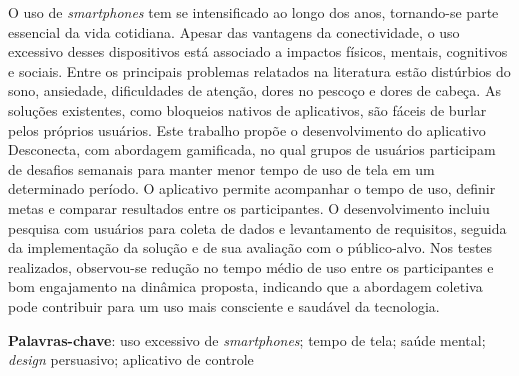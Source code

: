 \begin{resumo}
\begin{SingleSpace}
O uso de \textit{smartphones} tem se intensificado ao longo dos anos, tornando-se parte essencial da vida cotidiana. Apesar das vantagens da conectividade, o uso excessivo desses dispositivos está associado a impactos físicos, mentais, cognitivos e sociais. Entre os principais problemas relatados na literatura estão distúrbios do sono, ansiedade, dificuldades de atenção, dores no pescoço e dores de cabeça. As soluções existentes, como bloqueios nativos de aplicativos, são fáceis de burlar pelos próprios usuários. Este trabalho propõe o desenvolvimento do aplicativo Desconecta, com abordagem gamificada, no qual grupos de usuários participam de desafios semanais para manter menor tempo de uso de tela em um determinado período. O aplicativo permite acompanhar o tempo de uso, definir metas e comparar resultados entre os participantes. O desenvolvimento incluiu pesquisa com usuários para coleta de dados e levantamento de requisitos, seguida da implementação da solução e de sua avaliação com o público-alvo. Nos testes realizados, observou-se redução no tempo médio de uso entre os participantes e bom engajamento na dinâmica proposta, indicando que a abordagem coletiva pode contribuir para um uso mais consciente e saudável da tecnologia.
\end{SingleSpace}
\vspace{\onelineskip}
\textbf{Palavras-chave}: uso excessivo de \textit{smartphones}; tempo de tela; saúde mental; \textit{design} persuasivo; aplicativo de controle

\end{resumo}

